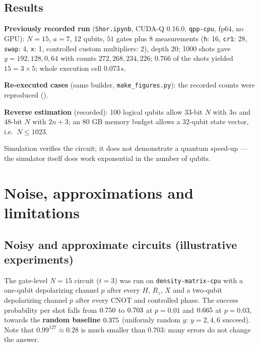 \documentclass[11pt,a4paper,openany]{book}
\begin{document}
\subsection{Results}
\textbf{Previously recorded run} (\texttt{Shor.ipynb}, CUDA-Q 0.16.0, \texttt{qpp-cpu}, fp64, no GPU): $N = 15$, $a = 7$, 12 qubits, $51$ gates plus $8$
measurements (\texttt{h}: 16, \texttt{cr1}: 28, \texttt{swap}: 4, \texttt{x}: 1, controlled custom multipliers: 2), depth 20; 1000 shots gave
$y = 192, 128, 0, 64$ with counts $272, 268, 234, 226$; $0.766$ of the shots yielded $15 = 3\times5$; whole execution cell $0.073$\,s.

\textbf{Re-executed cases} (same builder, \texttt{make\_figures.py}): the recorded counts were reproduced (\numreproduced).
\begin{center}
\resizebox{\linewidth}{!}{}
\end{center}
\textbf{Reverse estimation} (recorded): 100 logical qubits allow 33-bit $N$ with $3n$ and 48-bit $N$ with $2n + 3$; an 80 GB memory budget allows a 32-qubit
state vector, i.e.\ $N \le 1023$.
\begin{trap}
Simulation verifies the circuit; it does not demonstrate a quantum speed-up --- the simulator itself does work exponential in the number of qubits.
\end{trap}

\section{Noise, approximations and limitations}
\subsection{Noisy and approximate circuits (illustrative experiments)}
The gate-level $N = 15$ circuit ($t = 3$) was run on \texttt{density-matrix-cpu} with a one-qubit depolarizing channel $p$ after every $H$, $R_z$, $X$ and a
two-qubit depolarizing channel $p$ after every CNOT and controlled phase. The success probability per shot falls from $0.750$ to $0.703$ at
$p = 0.01$ and $0.665$ at $p = 0.03$, towards the \textbf{random baseline} $0.375$ (uniformly random $y$: $y = 2, 4, 6$ succeed). Note that
$0.99^{127} \approx 0.28$ is much smaller than $0.703$: many errors do not change the answer.
\end{document}
